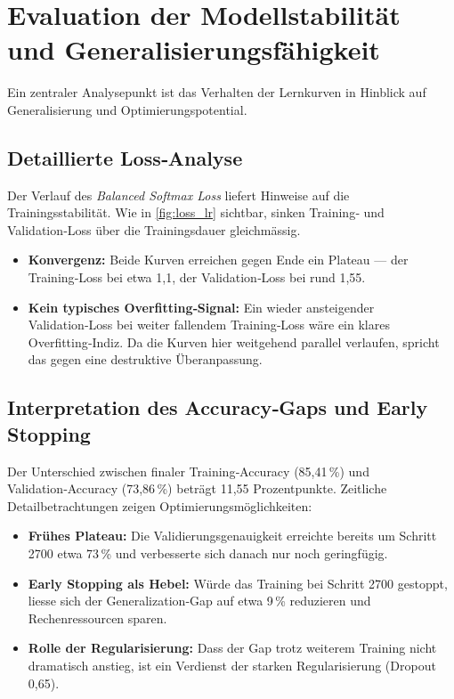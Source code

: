 \section{Evaluation der Modellstabilität und Generalisierungsfähigkeit}
Ein zentraler Analysepunkt ist das Verhalten der Lernkurven in Hinblick auf Generalisierung und Optimierungspotential.

\subsection{Detaillierte Loss‑Analyse}
Der Verlauf des \textit{Balanced Softmax Loss} liefert Hinweise auf die Trainingsstabilität. Wie in \autoref{fig:loss_lr} sichtbar, sinken Training‑ und Validation‑Loss über die Trainingsdauer gleichmässig.
\begin{itemize}
    \item \textbf{Konvergenz:} Beide Kurven erreichen gegen Ende ein Plateau — der Training‑Loss bei etwa 1,1, der Validation‑Loss bei rund 1,55.
    \item \textbf{Kein typisches Overfitting‑Signal:} Ein wieder ansteigender Validation‑Loss bei weiter fallendem Training‑Loss wäre ein klares Overfitting‑Indiz. Da die Kurven hier weitgehend parallel verlaufen, spricht das gegen eine destruktive Überanpassung.
\end{itemize}

\subsection{Interpretation des Accuracy‑Gaps und Early Stopping}
Der Unterschied zwischen finaler Training‑Accuracy (85,41\,\%) und Validation‑Accuracy (73,86\,\%) beträgt 11,55 Prozentpunkte. Zeitliche Detailbetrachtungen zeigen Optimierungsmöglichkeiten:
\begin{itemize}
    \item \textbf{Frühes Plateau:} Die Validierungsgenauigkeit erreichte bereits um Schritt 2700 etwa 73\,\% und verbesserte sich danach nur noch geringfügig.
    \item \textbf{Early Stopping als Hebel:} Würde das Training bei Schritt 2700 gestoppt, liesse sich der Generalization‑Gap auf etwa 9\,\% reduzieren und Rechenressourcen sparen.
    \item \textbf{Rolle der Regularisierung:} Dass der Gap trotz weiterem Training nicht dramatisch anstieg, ist ein Verdienst der starken Regularisierung (Dropout 0,65).
\end{itemize}


